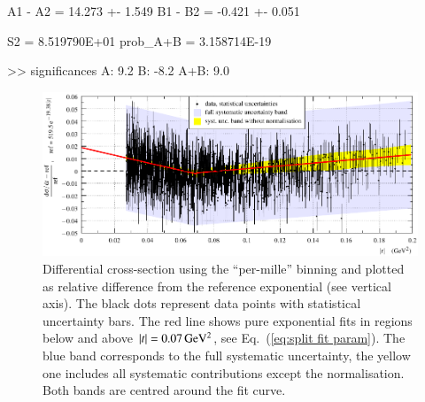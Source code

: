 A1 - A2 = 14.273 +- 1.549
B1 - B2 = -0.421 +- 0.051

S2 = 8.519790E+01
prob_A+B = 3.158714E-19

>> significances
        A: 9.2
        B: -8.2
        A+B: 9.0
\fi

\begin{figure}
\begin{center}
\includegraphics{fig/t_dist_rel_with_split_fit.pdf}
\vskip-4mm
\caption{%
Differential cross-section using the ``per-mille'' binning and plotted as relative difference from the reference exponential (see vertical axis). The black dots represent data points with statistical uncertainty bars. The red line shows pure exponential fits in regions below and above $|t| = 0.07\,{\rm GeV^2}$, see Eq.~(\ref{eq:split fit param}). The blue band corresponds to the full systematic uncertainty, the yellow one includes all systematic contributions except the normalisation. Both bands are centred around the fit curve.
}
\label{fig:data rel cpb0.001}
\end{center}
\end{figure}

